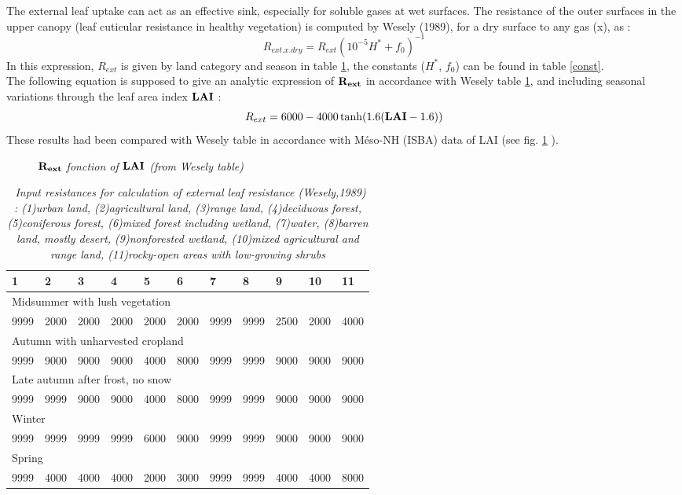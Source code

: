 The external leaf uptake can act as an effective sink, especially for soluble
gases at wet surfaces. 
The resistance of the outer surfaces in the upper canopy (leaf cuticular
resistance in healthy vegetation) is computed by Wesely (1989), for a
dry surface to any gas (x), as :
\[R_{ext.x.dry}=R_{ext}(10^{-5}H^*+f_0)^{-1}\]
In this expression, $R_{ext}$ is given by land category and season in table
\ref{resdebase},  the constants ($H^*$, $f_0$) can be found in table 
\ref{const}.\\
The following equation is supposed to give an analytic expression of
$\bf{R_{ext}}$ in accordance with Wesely table \ref{resdebase}, and 
including seasonal variations through the leaf area index $\bf LAI$ :
\[R_{ext}=6000 - 4000 \tanh(1.6( {\bf{LAI}} -1.6))\]
These results had been compared with Wesely table in accordance with 
Méso-NH (ISBA) data of LAI (see fig. \ref{lai_rext} ).
\begin{figure}
\centerline{}
\label{lai_rext}
\caption{\sl{$\bf{R_{ext}}$ fonction of $\bf{LAI}$ (from Wesely table)}}
\end{figure}

\begin{table}
\begin{center}
\begin{tabular}{lllllllllll}
\hline
1&2&3&4&5&6&7&8&9&10&11 \\ \hline
\multicolumn{11}{l}{Midsummer with lush vegetation}\\
9999 & 2000& 2000&   2000   & 2000  & 2000  & 9999 & 9999 & 2500 & 2000 & 4000
\\
\multicolumn{11}{l}{Autumn with unharvested cropland}\\
9999 & 9000& 9000&   9000   & 4000  & 8000  & 9999 & 9999 & 9000 & 9000 & 9000
\\
\multicolumn{11}{l}{Late autumn after frost, no snow}\\
9999 & 9999 & 9000&   9000   & 4000  & 8000  & 9999 & 9999 & 9000 & 9000 & 9000
\\
\multicolumn{11}{l}{Winter}\\
9999 & 9999 & 9999 & 9999 & 6000  & 9000  & 9999 & 9999 & 9000 & 9000 & 9000
\\
\multicolumn{11}{l}{Spring}\\
9999 & 4000& 4000&   4000   & 2000  & 3000  & 9999& 9999&  4000 & 4000 & 8000
\\ \hline
\end{tabular}
\caption { \sl~{Input resistances for calculation of external leaf resistance
(Wesely,1989) : (1)urban land, (2)agricultural land, (3)range land,
(4)deciduous forest, (5)coniferous forest, (6)mixed forest
including wetland, (7)water, (8)barren land, mostly desert,
(9)nonforested wetland, (10)mixed agricultural and range land,
(11)rocky-open areas with low-growing shrubs}} 
\label{resdebase}

\end{center}
\end{table}


